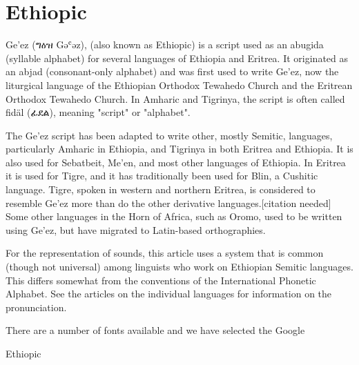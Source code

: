 
\newfontfamily{}

\section{Ethiopic}

Ge'ez ({\ethiopic ግዕዝ} Gəʿəz), (also known as Ethiopic) is a script used as an abugida (syllable alphabet) for several languages of Ethiopia and Eritrea. It originated as an abjad (consonant-only alphabet) and was first used to write Ge'ez, now the liturgical language of the Ethiopian Orthodox Tewahedo Church and the Eritrean Orthodox Tewahedo Church. In Amharic and Tigrinya, the script is often called fidäl ({\ethiopic ፊደል}), meaning "script" or "alphabet".

The Ge'ez script has been adapted to write other, mostly Semitic, languages, particularly Amharic in Ethiopia, and Tigrinya in both Eritrea and Ethiopia. It is also used for Sebatbeit, Me'en, and most other languages of Ethiopia. In Eritrea it is used for Tigre, and it has traditionally been used for Blin, a Cushitic language. Tigre, spoken in western and northern Eritrea, is considered to resemble Ge'ez more than do the other derivative languages.[citation needed] Some other languages in the Horn of Africa, such as Oromo, used to be written using Ge'ez, but have migrated to Latin-based orthographies.

For the representation of sounds, this article uses a system that is common (though not universal) among linguists who work on Ethiopian Semitic languages. This differs somewhat from the conventions of the International Phonetic Alphabet. See the articles on the individual languages for information on the pronunciation.

There are a number of fonts available and we have selected the Google 


\begin{scriptexample}[]{Ethiopic}
\end{scriptexample}





